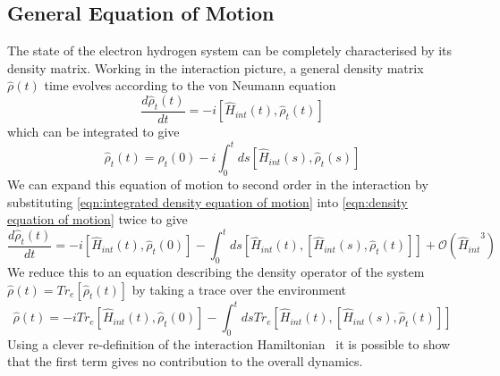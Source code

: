 
\subsection{General Equation of Motion}
The state of the electron hydrogen
system can be completely
characterised by its density
matrix.
Working in the interaction
picture, a general density matrix
\(\hat{\rho}(t)\) time evolves according
to the von Neumann equation\cite{TP2_Notes}
\begin{equation}
    \frac{d\hat{\rho}_t(t)}{dt} =
    -i [\hat{H}_{int}(t), \hat{\rho}_t(t)]
    \label{eqn:density equation of motion}
\end{equation}
which can be integrated to give
\begin{equation}
    \hat{\rho}_t(t) =
    \hat{\rho}_t(0)
    - i \int_0^t ds
        [\hat{H}_{int}(s), \hat{\rho}_t(s)]
    \label{eqn:integrated density equation of motion}
\end{equation}
We can expand this equation of motion
to second order in the interaction
by substituting \cref{eqn:integrated density equation of motion}
into \cref{eqn:density equation of motion}
twice to give
\begin{equation}
    \frac{d\hat{\rho}_t(t)}{dt} =
    -i [\hat{H}_{int}(t), \hat{\rho}_t(0)]
    - \int_0^t ds
        [\hat{H}_{int}(t),
            [\hat{H}_{int}(s), \hat{\rho}_t(t)]]
    +\mathcal{O}({\hat{H}_{int}}^3)
    \label{eqn:second order eqn of motion}
\end{equation}
We reduce this to an equation describing
the density operator of
the system \(\hat{\rho}(t) = Tr_e[\hat{\rho}_t(t)]\)
by taking a trace over the environment\cite{Manzano_2020}
\begin{equation}
    \hat{\rho}(t) =
    -i Tr_e[\hat{H}_{int}(t), \hat{\rho}_t(0)]
    - \int_0^t ds
    Tr_e[\hat{H}_{int}(t),
    [\hat{H}_{int}(s), \hat{\rho}_t(t)]]
    \label{eqn:density motion before redfield approximation}
\end{equation}
Using a clever re-definition of the interaction
Hamiltonian~\cite{Manzano_2020} it
is possible to show that the first
term gives no contribution to the
overall dynamics.

